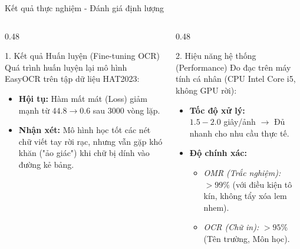 \documentclass[10pt, aspectratio=169]{beamer}
\begin{document}
\begin{frame}{Kết quả thực nghiệm - Đánh giá định lượng}
	
	\begin{columns}[t]
		\begin{column}{0.48\textwidth}
			\begin{block}{1. Kết quả Huấn luyện (Fine-tuning OCR)}
				Quá trình huấn luyện lại mô hình EasyOCR trên tập dữ liệu HAT2023:
				\begin{itemize}
					\setlength\itemsep{0.5em}
					\item \textbf{Hội tụ:} Hàm mất mát (Loss) giảm mạnh từ $44.8 \to 0.6$ sau 3000 vòng lặp.
					\item \textbf{Nhận xét:} Mô hình học tốt các nét chữ viết tay rời rạc, nhưng vẫn gặp khó khăn ("ảo giác") khi chữ bị dính vào đường kẻ bảng.
				\end{itemize}
			\end{block}
		\end{column}
		
		\begin{column}{0.48\textwidth}
			\begin{alertblock}{2. Hiệu năng hệ thống (Performance)}
				Đo đạc trên máy tính cá nhân (CPU Intel Core i5, không GPU rời):
				\begin{itemize}
					\setlength\itemsep{0.5em}
					\item \textbf{Tốc độ xử lý:} 
					\\ $1.5 - 2.0$ giây/ảnh $\to$ Đủ nhanh cho nhu cầu thực tế.
					\item \textbf{Độ chính xác:}
					\begin{itemize} \footnotesize
						\item \textit{OMR (Trắc nghiệm):} \textbf{$>99\%$} (với điều kiện tô kín, không tẩy xóa lem nhem).
						\item \textit{OCR (Chữ in):} \textbf{$>95\%$} (Tên trường, Môn học).
					\end{itemize}
				\end{itemize}
			\end{alertblock}
		\end{column}
	\end{columns}
	
\end{frame}
\end{document}

